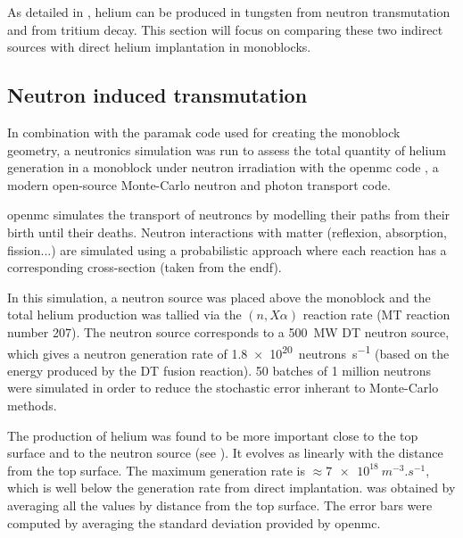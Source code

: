 As detailed in , helium can be produced in tungsten from neutron \gls{transmutation} and from tritium decay.
This section will focus on comparing these two indirect sources with direct helium implantation in \glspl{monoblock}.

\subsection{Neutron induced transmutation}

In combination with the \gls{paramak} code  used for creating the \gls{monoblock} geometry, a neutronics simulation was run to assess the total quantity of helium generation in a \gls{monoblock} under neutron irradiation with the \gls{openmc} code , a modern open-source Monte-Carlo neutron and photon transport code.

\Gls{openmc} simulates the transport of neutroncs by modelling their paths from their birth until their deaths.
Neutron interactions with matter (reflexion, absorption, fission...) are simulated using a probabilistic approach where each reaction has a corresponding cross-section (taken from the \gls{endf}).

In this simulation, a neutron source was placed above the \gls{monoblock} and the total helium production was tallied via the $(n,X\alpha)$ reaction rate (MT reaction number 207).
The neutron source corresponds to a \SI{500}{MW} DT neutron source, which gives a neutron generation rate of \SI{1.8e20}{neutrons.s^{-1}} (based on the energy produced by the DT fusion reaction).
50 batches of 1 million neutrons were simulated in order to reduce the stochastic error inherant to Monte-Carlo methods.

The production of helium was found to be more important close to the top surface and to the neutron source (see ).
It evolves as linearly with the distance from the top surface.
The maximum generation rate is $\approx \SI{7e18}{m^{-3}.s^{-1}}$, which is well below the generation rate from direct implantation.
 was obtained by averaging all the values by distance from the top surface.
The error bars were computed by averaging the standard deviation provided by \gls{openmc}.

